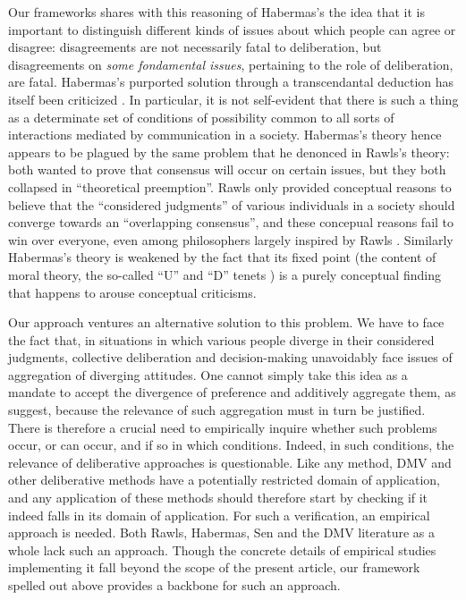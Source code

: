 \documentclass[version=3.21, pagesize, twoside=off, bibliography=totoc, DIV=calc, fontsize=12pt, a4paper, french, english]{scrartcl}
\begin{document}
Our frameworks shares with this reasoning of Habermas's the idea that it is important to distinguish different kinds of issues about which people can agree or disagree: disagreements are not necessarily fatal to deliberation, but disagreements on \emph{some fondamental issues}, pertaining to the role of deliberation, are fatal. Habermas's purported solution through a transcendantal deduction has itself been criticized \citep{heath_communicative_2001}. 
In particular, it is not self-evident that there is such a thing as a determinate set of conditions of possibility common to all sorts of interactions mediated by communication in a society. 
Habermas's theory hence appears to be plagued by the same problem that he denonced in Rawls's theory: both wanted to prove that consensus will occur on certain issues, but they both collapsed in ``theoretical preemption''. Rawls only provided conceptual reasons to believe that the “considered judgments” of various individuals in a society should converge towards an “overlapping consensus”, and these concepual reasons fail to win over everyone, even among philosophers largely inspired by Rawls \citep{estlund_insularity_1998, estlund_democratic_2009}. 
Similarly Habermas's theory is weakened by the fact that its fixed point (the content of moral theory, the so-called “U” and “D” tenets \citep{habermas_moralbewustsein_1983}) is a purely conceptual finding that happens to arouse conceptual criticisms.

Our approach ventures an alternative solution to this problem. 
We have to face the fact that, in situations in which various people diverge in their considered judgments, collective deliberation and decision-making unavoidably face issues of aggregation of diverging attitudes. 
One cannot simply take this idea as a mandate to accept the divergence of preference and additively aggregate them, as \citeauthor{bartkowski_beyond_2018} suggest, because the relevance of such aggregation must in turn be justified. 
There is therefore a crucial need to empirically inquire whether such problems occur, or can occur, and if so in which conditions. Indeed, in such conditions, the relevance of deliberative approaches is questionable. 
Like any method, DMV and other deliberative methods have a potentially restricted domain of application, and any application of these methods should therefore start by checking if it indeed falls in its domain of application. 
For such a verification, an empirical approach is needed. 
Both Rawls, Habermas, Sen and the DMV literature as a whole lack such an approach. 
Though the concrete details of empirical studies implementing it fall beyond the scope of the present article, our framework spelled out above provides a backbone for such an approach.
\end{document}
